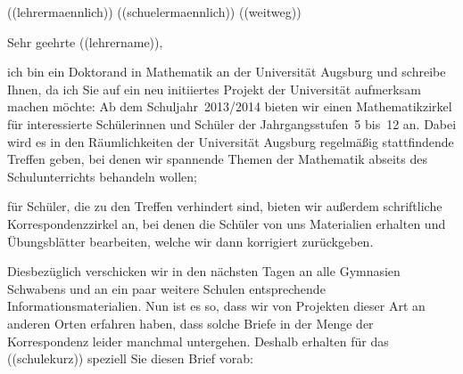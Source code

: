 \documentclass{../../zirkelbrief}
\begin{document}
\renewcommand{\anschrift}{%
      ((schule)) \\
      ((lehrername)) \\
      ((strasse)) \\
      ((plz)) ((ort))}
\renewcommand{\datum}{\today}
\renewcommand{\betreff}{Matheschülerzirkel der Universität Augsburg}
\renewcommand{\absender}{%
      \textbf{Ingo Blechschmidt} \\
      \ \\
      Lehrstuhl für Algebra und Zahlentheorie \\
      Universitätsstr. 14 \\
      86159 Augsburg \\
      \ \\
      Telefon \> +49 (0) 821 598 -- 5601 \\
      Telefax \> +49 (0) 821 598 -- 2090 \\
      \textsf{blechschmidt@math.uni-augsburg.de} \\}

\makeletterhead

\newif\iflehrermaennlich\lehrermaennlich((lehrermaennlich))
\newif\ifschuelermaennlich\schuelermaennlich((schuelermaennlich))
\newif\ifweitweg\weitweg((weitweg))

\iflehrermaennlich
Sehr geehrter ((lehrername)),
\else
Sehr geehrte ((lehrername)),
\fi

ich bin ein Doktorand in Mathematik an der Universität Augsburg und schreibe
Ihnen, da ich Sie auf ein neu initiiertes Projekt der Universität aufmerksam machen
möchte: Ab dem Schuljahr~2013/2014 bieten wir einen Mathematikzirkel für
interessierte Schülerinnen und Schüler der Jahrgangsstufen~5 bis~12 an. Dabei
wird es in den Räumlichkeiten der Universität Augsburg regelmäßig stattfindende
Treffen geben, bei denen wir spannende Themen der Mathematik abseits des
Schulunterrichts behandeln wollen;
\ifweitweg
da ((ort)) ja recht weit von Augsburg entfernt liegt, bieten wir außerdem
schriftliche Korrespondenzzirkel an, bei denen die Schüler von uns Materialien
erhalten und Übungsblätter bearbeiten, welche wir dann korrigiert zurückgeben.
\else
für Schüler, die zu den Treffen verhindert sind, bieten wir außerdem
schriftliche Korrespondenzzirkel an, bei denen die Schüler von uns Materialien
erhalten und Übungsblätter bearbeiten, welche wir dann korrigiert zurückgeben.
\fi

Diesbezüglich verschicken wir in den nächsten Tagen an alle Gymnasien Schwabens
und an ein paar weitere Schulen entsprechende Informationsmaterialien. Nun ist es
so, dass wir von Projekten dieser Art an anderen Orten erfahren haben, dass
solche Briefe in der Menge der Korrespondenz leider manchmal untergehen.
Deshalb erhalten für das ((schulekurz)) speziell Sie diesen Brief vorab:
\end{document}
